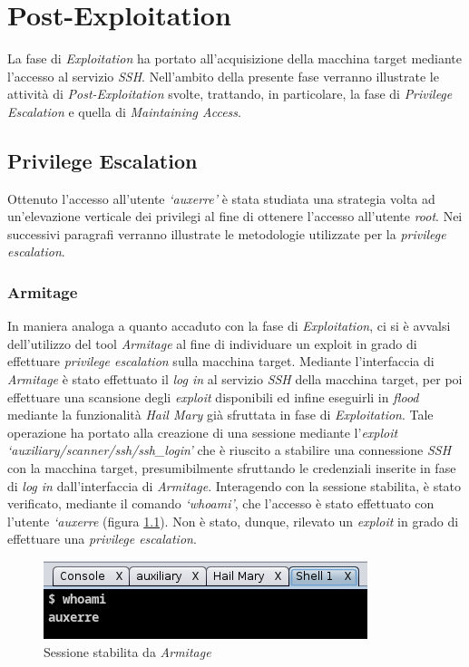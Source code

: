 
\chapter{Post-Exploitation}
La fase di \emph{Exploitation} ha portato all'acquisizione della macchina target mediante l'accesso al servizio \emph{SSH}. Nell'ambito della presente fase verranno illustrate le attività di \emph{Post-Exploitation} svolte, trattando, in particolare, la fase di \emph{Privilege Escalation} e quella di \emph{Maintaining Access}. 
\section{Privilege Escalation}
Ottenuto l'accesso all'utente \emph{`auxerre'} è stata studiata una strategia volta ad un'elevazione verticale dei privilegi al fine di ottenere l'accesso all'utente \emph{root}. Nei successivi paragrafi verranno illustrate le metodologie utilizzate per la \emph{privilege escalation}.
\subsection{Armitage}
In maniera analoga a quanto accaduto con la fase di \emph{Exploitation}, ci si è avvalsi dell'utilizzo del tool \emph{Armitage} al fine di individuare un exploit in grado di effettuare \emph{privilege escalation} sulla macchina target. Mediante l'interfaccia di \emph{Armitage} è stato effettuato il \emph{log in} al servizio \emph{SSH} della macchina target, per poi effettuare una scansione degli \emph{exploit} disponibili ed infine eseguirli in \emph{flood} mediante la funzionalità \emph{Hail Mary} già sfruttata in fase di \emph{Exploitation}. Tale operazione ha portato alla creazione di una sessione mediante l'\emph{exploit} \emph{`auxiliary/scanner/ssh/ssh\_login'} che è riuscito a stabilire una connessione \emph{SSH} con la macchina target, presumibilmente sfruttando le credenziali inserite in fase di \emph{log in} dall'interfaccia di \emph{Armitage}. Interagendo con la sessione stabilita, è stato verificato, mediante il comando \emph{`whoami'}, che l'accesso è stato effettuato con l'utente \emph{`auxerre} (figura \ref{fig:armitage_ssh}). Non è stato, dunque, rilevato un \emph{exploit} in grado di effettuare una \emph{privilege escalation}.
\begin{figure}[h]
    \centering
    \includegraphics[scale=1]{capitoli/images/armitage_ssh.png}
    \caption{Sessione stabilita da \emph{Armitage}}
    \label{fig:armitage_ssh}
\end{figure}
